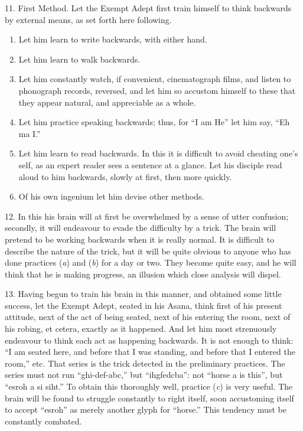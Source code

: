 11. First Method.  Let the Exempt Adept first train himself to think backwards by external means, as set forth here following.
\begin{enumerate}[label=(\alph*)]
\item Let him learn to write backwards, with either hand.
\item Let him learn to walk backwards.
\item Let him constantly watch, if convenient, cinematograph films, and listen to phonograph records, reversed, and let him so accustom himself to these that they appear natural, and appreciable as a whole.
\item Let him practice speaking backwards; thus, for \enquote{I am He} let him say, \enquote{Eh ma I.}
\item Let him learn to read backwards. In this it is difficult to avoid cheating one’s self, as an expert reader sees a sentence at a glance. Let his disciple read aloud to him backwards, slowly at first, then more quickly.
\item Of his own ingenium let him devise other methods.
\end{enumerate}

12. In this his brain will at first be overwhelmed by a sense of utter confusion; secondly, it will endeavour to evade the difficulty by a trick. The brain will pretend to be working backwards when it is really normal. It is difficult to describe the nature of the trick, but it will be quite obvious to anyone who has done practices (\textit{a}) and (\textit{b}) for a day or two. They become quite easy, and he will think that he is making progress, an illusion which close analysis will dispel.

13. Having begun to train his brain in this manner, and obtained some little success, let the Exempt Adept, seated in his Asana, think first of his present attitude, next of the act of being seated, next of his entering the room, next of his robing, et cetera, exactly as it happened. And let him most strenuously endeavour to think each act as happening backwards. It is not enough to think: \enquote{I am seated here, and before that I was standing, and before that I entered the room,} etc. That series is the trick detected in the preliminary practices.  The series must not run \mbox{\enquote{ghi-def-abc,}} but \mbox{\enquote{ihgfedcba}}: not \enquote{horse a is this}, but \enquote{esroh a si siht.} To obtain this thoroughly well, practice (\textit{c}) is very useful. The brain will be found to struggle constantly to right itself, soon accustoming itself to accept \enquote{esroh} as merely another glyph for \enquote{horse.} This tendency must be constantly combated.

